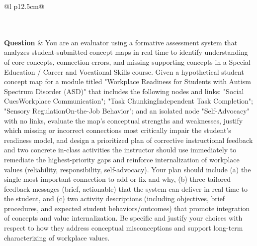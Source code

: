 \begin{longtable}{@{}l p{12.5cm}@{}}
  \caption{Skills per-instance answer comparison ($50\% \leq \Delta < 75\%$) for the 9 most divergent items: same question, each model's answer and reasoning.}\label{tab:cmp_skills_pos50} \\
  \toprule
  \endfirsthead
  \toprule
  \endhead
   \\
  \textbf{Question} & You are an evaluator using a formative assessment system that analyzes student-submitted concept maps in real time to identify understanding of core concepts, connection errors, and missing supporting concepts in a Special Education / Career and Vocational Skills course. Given a hypothetical student concept map for a module titled "Workplace Readiness for Students with Autism Spectrum Disorder (ASD)" that includes the following nodes and links: "Social CuesWorkplace Communication"; "Task ChunkingIndependent Task Completion"; "Sensory RegulationOn-the-Job Behavior"; and an isolated node "Self-Advocacy" with no links, evaluate the map's conceptual strengths and weaknesses, justify which missing or incorrect connections most critically impair the student's readiness model, and design a prioritized plan of corrective instructional feedback and two concrete in-class activities the instructor should use immediately to remediate the highest-priority gaps and reinforce internalization of workplace values (reliability, responsibility, self-advocacy). Your plan should include (a) the single most important connection to add or fix and why, (b) three tailored feedback messages (brief, actionable) that the system can deliver in real time to the student, and (c) two activity descriptions (including objectives, brief procedures, and expected student behaviors/outcomes) that promote integration of concepts and value internalization. Be specific and justify your choices with respect to how they address conceptual misconceptions and support long-term characterizing of workplace values. \\

\end{longtable}
